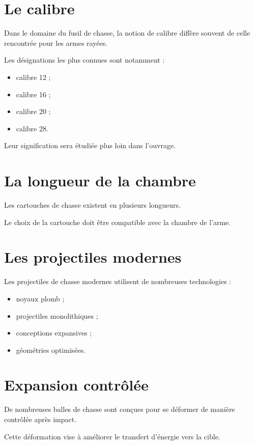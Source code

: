 \section{Le calibre}

Dans le domaine du fusil de chasse, la notion de calibre diffère souvent de
celle rencontrée pour les armes rayées.

Les désignations les plus connues sont notamment :

\begin{itemize}
    \item calibre 12 ;
    \item calibre 16 ;
    \item calibre 20 ;
    \item calibre 28.
\end{itemize}

Leur signification sera étudiée plus loin dans l'ouvrage.

\section{La longueur de la chambre}

Les cartouches de chasse existent en plusieurs longueurs.

Le choix de la cartouche doit être compatible avec la chambre de l'arme.

\section{Les projectiles modernes}

Les projectiles de chasse modernes utilisent de nombreuses technologies :

\begin{itemize}
    \item noyaux plomb ;
    \item projectiles monolithiques ;
    \item conceptions expansives ;
    \item géométries optimisées.
\end{itemize}

\section{Expansion contrôlée}

De nombreuses balles de chasse sont conçues pour se déformer de manière
contrôlée après impact.

Cette déformation vise à améliorer le transfert d'énergie vers la cible.

